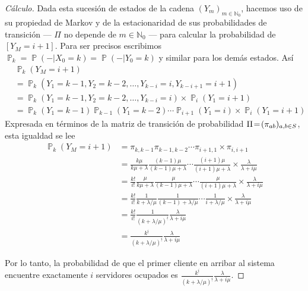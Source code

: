 \documentclass{article}
\DeclareMathOperator{\prob}{\mathbb{P}}
\newcommand{\placeholderParameter}{-}
\newcommand{\naturalnum}{\mathbb{N}}
\theoremstyle{definition}
\begin{document}
\begin{proof}[Cálculo]
Dada esta sucesión de estados de la cadena \((Y_m)_{m \in \naturalnum_0}\), hacemos uso de su propiedad de Markov y de la estacionaridad de sus probabilidades de transición --- \(\Pi\) no depende de \(m \in \naturalnum_0\) --- para calcular la probabilidad de \([Y_M = i + 1]\).
Para ser precisos escribimos \(\prob_k = \prob(\placeholderParameter | X_0 = k) = \prob(\placeholderParameter | Y_0 = k)\) y similar para los demás estados.
Así
\begin{align}
	&\prob_k(Y_M = i + 1) 
	\\
	&=
		\prob_k(Y_1 = k - 1, Y_2 = k - 2, \dots, Y_{k - i} = i, Y_{k - i + 1} = i + 1)
	\\
	&=
		\prob_k(Y_1 = k - 1, Y_2 = k - 2, \dots, Y_{k - i} = i) \times \prob_i(Y_1 = i + 1)
	\\
	&=
		\prob_k(Y_1 = k - 1) \prob_{k - 1}(Y_1 = k - 2) \cdots \prob_{i + 1}(Y_1 = i) \times \prob_i(Y_1 = i + 1)
\end{align}
Expresada en términos de la matriz de transición de probabilidad \(\Pi \! = \! (\pi_{a b})_{a,b \in S}\), esta igualdad se lee
\begin{align}
	\prob_k(Y_M = i + 1)
	&=
		\pi_{k, k - 1} \pi_{k - 1, k - 2} \cdots \pi_{i + 1, 1} \times \pi_{i, i + 1}
		\\
	&= 
		\frac{k \mu}{k \mu + \lambda} \frac{(k - 1) \mu}{(k - 1) \mu + \lambda} \cdots \frac{(i + 1) \mu}{(i + 1) \mu + \lambda} \times \frac{\lambda}{\lambda + i \mu}
	\\
	&= 
		\frac{k!}{i!} \frac{ \mu}{k \mu + \lambda} \frac{\mu}{(k - 1) \mu + \lambda} \cdots \frac{\mu}{(i + 1) \mu + \lambda} \times \frac{\lambda}{\lambda + i \mu}
	\\
	&= 
		\frac{k!}{i!} \frac{1}{k + \lambda / \mu} \frac{1}{(k - 1) + \lambda / \mu} \cdots \frac{1}{i + \lambda / \mu} \times \frac{\lambda}{\lambda + i \mu}
	\\
	&= 
		\frac{k!}{i!} \frac{1}{(k + \lambda / \mu)^{\underline{i}}} \frac{\lambda}{\lambda + i \mu}
	\\
	&= 
		\frac{k^{\underline{i}}}{(k + \lambda / \mu)^{\underline{i}}} \frac{\lambda}{\lambda + i \mu}
\end{align}

Por lo tanto, la probabilidad de que el primer cliente en arribar al sistema encuentre exactamente \(i\) servidores ocupados es \(\displaystyle \frac{k^{\underline{i}}}{(k + \lambda / \mu)^{\underline{i}}} \frac{\lambda}{\lambda + i \mu}\).
\end{proof}
\end{document}
